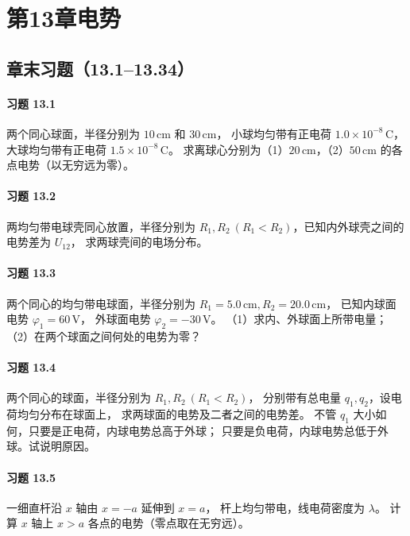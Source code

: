 \section*{第13章\quad 电势}
\subsection*{章末习题（13.1--13.34）}
\paragraph{习题 13.1}
两个同心球面，半径分别为 \(10\,\mathrm{cm}\) 和 \(30\,\mathrm{cm}\)，
小球均匀带有正电荷 \(1.0\times10^{-8}\,\mathrm C\)，
大球均匀带有正电荷 \(1.5\times10^{-8}\,\mathrm C\)。
求离球心分别为（1）\(20\,\mathrm{cm}\)，（2）\(50\,\mathrm{cm}\)
的各点电势（以无穷远为零）。

\paragraph{习题 13.2}
两均匀带电球壳同心放置，半径分别为
\(R_1,R_2\ (R_1<R_2)\)，已知内外球壳之间的电势差为 \(U_{12}\)，
求两球壳间的电场分布。

\paragraph{习题 13.3}
两个同心的均匀带电球面，半径分别为
\(R_1=5.0\,\mathrm{cm},R_2=20.0\,\mathrm{cm}\)，
已知内球面电势 \(\varphi_1=60\,\mathrm V\)，
外球面电势 \(\varphi_2=-30\,\mathrm V\)。
（1）求内、外球面上所带电量；
（2）在两个球面之间何处的电势为零？

\paragraph{习题 13.4}
两个同心的球面，半径分别为 \(R_1,R_2\ (R_1<R_2)\)，
分别带有总电量 \(q_1,q_2\)，设电荷均匀分布在球面上，
求两球面的电势及二者之间的电势差。
不管 \(q_1\) 大小如何，只要是正电荷，内球电势总高于外球；
只要是负电荷，内球电势总低于外球。试说明原因。

\paragraph{习题 13.5}
一细直杆沿 \(x\) 轴由 \(x=-a\) 延伸到 \(x=a\)，
杆上均匀带电，线电荷密度为 \(\lambda\)。
计算 \(x\) 轴上 \(x>a\) 各点的电势（零点取在无穷远）。

